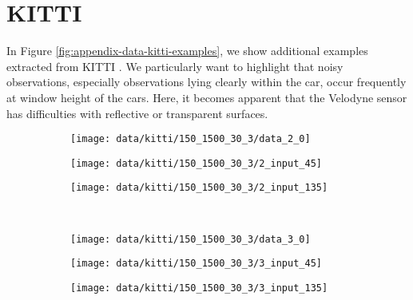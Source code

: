 \FloatBarrier
\newpage
\section{KITTI}
\label{sec:appendix-data-kitti}

In Figure \ref{fig:appendix-data-kitti-examples}, we show additional
examples extracted from KITTI \cite{GeigerLenzUrtasun:2012,GeigerLenzStillerUrtasun:2013}.
We particularly want to highlight that
noisy observations, especially observations lying clearly within the car,
occur frequently at window height of the cars. Here, it becomes apparent
that the Velodyne sensor has difficulties with reflective or transparent
surfaces.

\begin{figure}[h]
  \centering  
  \begin{subfigure}[t]{0.425\textwidth}
    \vspace{12px}
    \texttt{[image: data/kitti/150\_1500\_30\_3/data\_2\_0]}
  \end{subfigure}
  \begin{subfigure}[t]{0.2\textwidth}
    \vspace{0px}
    \texttt{[image: data/kitti/150\_1500\_30\_3/2\_input\_45]}
  \end{subfigure}
  \begin{subfigure}[t]{0.2\textwidth}
    \vspace{0px}
    \texttt{[image: data/kitti/150\_1500\_30\_3/2\_input\_135]}
  \end{subfigure}\\
  \begin{subfigure}[t]{0.425\textwidth}
    \vspace{12px}
    \texttt{[image: data/kitti/150\_1500\_30\_3/data\_3\_0]}
  \end{subfigure}
  \begin{subfigure}[t]{0.2\textwidth}
    \vspace{0px}
    \texttt{[image: data/kitti/150\_1500\_30\_3/3\_input\_45]}
  \end{subfigure}
  \begin{subfigure}[t]{0.2\textwidth}
    \vspace{0px}
    \texttt{[image: data/kitti/150\_1500\_30\_3/3\_input\_135]}
  \end{subfigure}\\

\end{figure}
